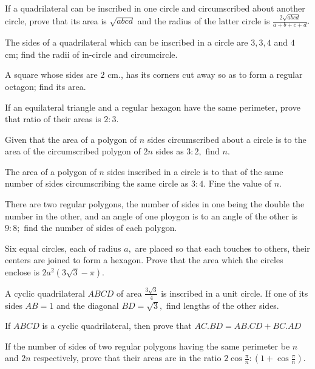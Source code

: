 \item If a quadrilateral can be inscribed in one circle and circumscribed about another circle, prove that its area is
   $\sqrt{abcd}$ and the radius of the latter circle is $\frac{2\sqrt{abcd}}{a + b + c + d}.$

\item The sides of a quadrilateral which can be inscribed in a circle are $3, 3, 4$ and $4$ cm; find the radii of
   in-circle and circumcircle.

\item A square whose sides are $2$ cm., has its corners cut away so as to form a regular octagon; find its area.

\item If an equilateral triangle and a regular hexagon have the same perimeter, prove that ratio of their areas is $2:3.$

\item Given that the area of a polygon of $n$ sides circumscribed about a circle is to the area of the circumscribed polygon of
   $2n$ sides as $3:2,$ find $n.$

\item The area of a polygon of $n$ sides inscribed in a circle is to that of the same number of sides circumscribing the same
   circle as $3:4.$ Fine the value of $n.$

\item There are two regular polygons, the number of sides in one being the double the number in the other, and an angle of one ploygon
   is to an angle of the other is $9:8;$ find the number of sides of each polygon.

\item Six equal circles, each of radius $a,$ are placed so that each touches to others, their centers are joined to form a
   hexagon. Prove that the area which the circles enclose is $2a^2(3\sqrt{3} - \pi).$

\item A cyclic quadrilateral $ABCD$ of area $\frac{3\sqrt{3}}{4}$ is inscribed in a unit circle. If one of its sides
   $AB = 1$ and the diagonal $BD=\sqrt{3},$ find lengths of the other sides.

\item If $ABCD$ is a cyclic quadrilateral, then prove that $AC.BD = AB.CD + BC.AD$

\item If the number of sides of two regular polygons having the same perimeter be $n$ and $2n$ respectively, prove that
   their areas are in the ratio $2\cos\frac{\pi}{n}:\left(1 + \cos\frac{\pi}{n}\right).$

